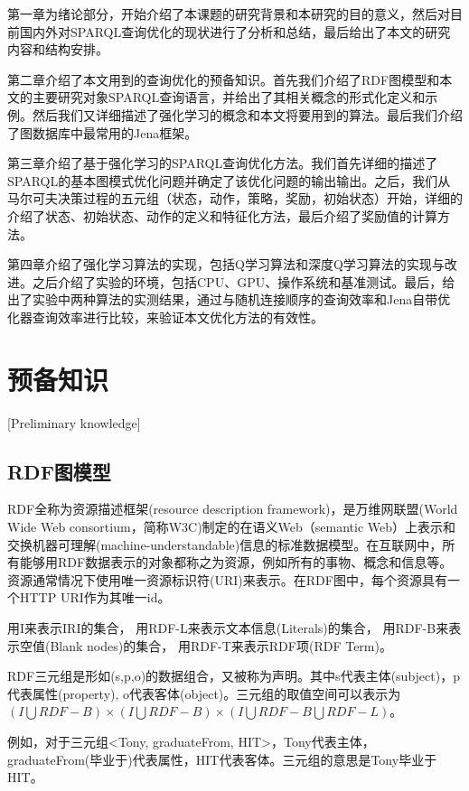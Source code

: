 第一章为绪论部分，开始介绍了本课题的研究背景和本研究的目的意义，然后对目前国内外对SPARQL查询优化的现状进行了分析和总结，最后给出了本文的研究内容和结构安排。

第二章介绍了本文用到的查询优化的预备知识。首先我们介绍了RDF图模型和本文的主要研究对象SPARQL查询语言，并给出了其相关概念的形式化定义和示例。然后我们又详细描述了强化学习的概念和本文将要用到的算法。最后我们介绍了图数据库中最常用的Jena框架。

第三章介绍了基于强化学习的SPARQL查询优化方法。我们首先详细的描述了SPARQL的基本图模式优化问题并确定了该优化问题的输出输出。之后，我们从马尔可夫决策过程的五元组（状态，动作，策略，奖励，初始状态）开始，详细的介绍了状态、初始状态、动作的定义和特征化方法，最后介绍了奖励值的计算方法。

第四章介绍了强化学习算法的实现，包括Q学习算法和深度Q学习算法的实现与改进。之后介绍了实验的环境，包括CPU、GPU、操作系统和基准测试。最后，给出了实验中两种算法的实测结果，通过与随机连接顺序的查询效率和Jena自带优化器查询效率进行比较，来验证本文优化方法的有效性。

\chapter{预备知识}[Preliminary knowledge]

\section{RDF图模型}

RDF全称为资源描述框架(resource description framework)，是万维网联盟(World Wide Web consortium，简称W3C)制定的在语义Web（semantic Web）上表示和交换机器可理解(machine-understandable)信息的标准数据模型。在互联网中，所有能够用RDF数据表示的对象都称之为资源，例如所有的事物、概念和信息等。资源通常情况下使用唯一资源标识符(URI)来表示。在RDF图中，每个资源具有一个HTTP URI作为其唯一id。

 \begin{definition}    
    用I来表示IRI的集合，
    用RDF-L来表示文本信息(Literals)的集合，
    用RDF-B来表示空值(Blank nodes)的集合，
    用RDF-T来表示RDF项(RDF Term)。
\end{definition}

\begin{definition}[（RDF三元组）]    
    RDF三元组是形如(s,p,o)的数据组合，又被称为声明。其中s代表主体(subject)，p代表属性(property),
    o代表客体(object)。三元组的取值空间可以表示为$(I\bigcup RDF-B)\times(I\bigcup RDF-B)\times(I\bigcup RDF-B\bigcup RDF-L)$。
    
    例如，对于三元组<Tony, graduateFrom, HIT>，Tony代表主体，graduateFrom(毕业于)代表属性，HIT代表客体。三元组的意思是Tony毕业于HIT。
\end{definition}

